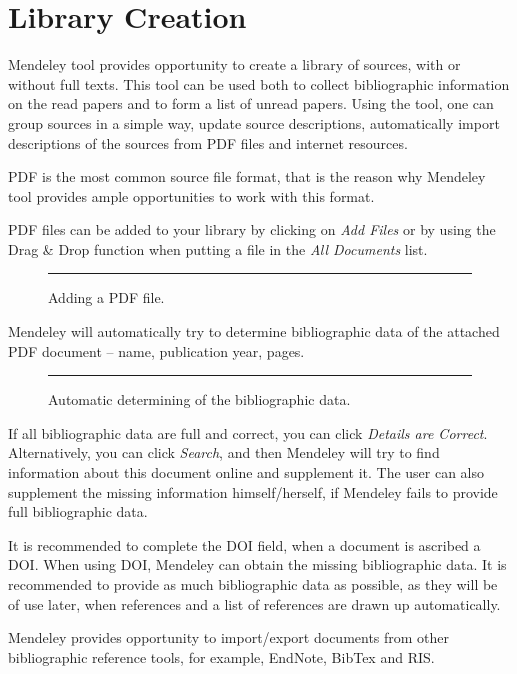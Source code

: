 \section{Library Creation}

Mendeley tool provides opportunity to create a library of sources, with or without full texts. This tool can be used both to collect bibliographic information on the read papers and to form a list of unread papers. Using the tool, one can group sources in a simple way, update source descriptions, automatically import descriptions of the sources from PDF files and internet resources.

PDF is the most common source file format, that is the reason why Mendeley tool provides ample opportunities to work with this format.

PDF files can be added to your library by clicking on \emph{Add Files} or by using the Drag \& Drop function when putting a file in the \emph{All Documents} list.

\begin{figure}[ht]
  \centering
  \rule{0.8\linewidth}{0.35\linewidth}
  \caption{Adding a PDF file.}
  \label{fig:mend-add-pdf}
\end{figure}

Mendeley will automatically try to determine bibliographic data of the attached PDF document – name, publication year, pages.

\begin{figure}[ht]
  \centering
  \rule{0.8\linewidth}{0.35\linewidth}
  \caption{Automatic determining of the bibliographic data.}
  \label{fig:mend-auto-meta}
\end{figure}

If all bibliographic data are full and correct, you can click \emph{Details are Correct}. Alternatively, you can click \emph{Search}, and then Mendeley will try to find information about this document online and supplement it. The user can also supplement the missing information himself/herself, if Mendeley fails to provide full bibliographic data.

It is recommended to complete the DOI field, when a document is ascribed a DOI. When using DOI, Mendeley can obtain the missing bibliographic data. It is recommended to provide as much bibliographic data as possible, as they will be of use later, when references and a list of references are drawn up automatically.

Mendeley provides opportunity to import/export documents from other bibliographic reference tools, for example, EndNote, BibTex and RIS.

